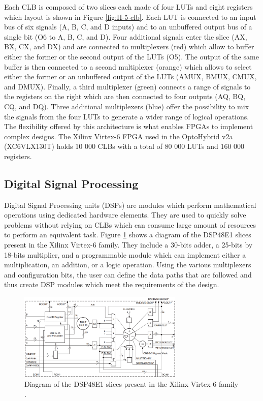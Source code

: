       Each CLB is composed of two slices each made of four LUTs and eight registers which layout is shown in Figure \ref{fig:II-5-clb}. Each LUT is connected to an input bus of six signals (A, B, C, and D inputs) and to an unbuffered output bus of a single bit (O6 to A, B, C, and D). Four additional signals enter the slice (AX, BX, CX, and DX) and are connected to multiplexers (red) which allow to buffer either the former or the second output of the LUTs (O5). The output of the same buffer is then connected to a second multiplexer (orange) which allows to select either the former or an unbuffered output of the LUTs (AMUX, BMUX, CMUX, and DMUX). Finally, a third multiplexer (green) connects a range of signals to the registers on the right which are then connected to four outputs (AQ, BQ, CQ, and DQ). Three additional multiplexers (blue) offer the possibility to mix the signals from the four LUTs to generate a wider range of logical operations. The flexibility offered by this architecture is what enables FPGAs to implement complex designs. The Xilinx Virtex-6 FPGA used in the OptoHybrid v2a (XC6VLX130T) holds 10 000 CLBs with a total of 80 000 LUTs and 160 000 registers.

    \subsection{Digital Signal Processing}

      Digital Signal Processing units (DSPs) \cite{VIRTEX-DSP} are modules which perform mathematical operations using dedicated hardware elements. They are used to quickly solve problems without relying on CLBs which can consume large amount of resources to perform an equivalent task. Figure \ref{fig:II-5-dsp} shows a diagram of the DSP48E1 slices present in the Xilinx Virtex-6 family. They include a 30-bits adder, a 25-bits by 18-bits multiplier, and a programmable module which can implement either a multiplication, an addition, or a logic operation. Using the various multiplexers and configuration bits, the user can define the data paths that are followed and thus create DSP modules which meet the requirements of the design.

      \begin{figure}[h!]
        \centering
        \includegraphics[width=0.7\textwidth]{img/II-5-irradiation/dsp.png}
        \caption{Diagram of the DSP48E1 slices present in the Xilinx Virtex-6 family \cite{VIRTEX-DSP}.}
        \label{fig:II-5-dsp}
      \end{figure}


